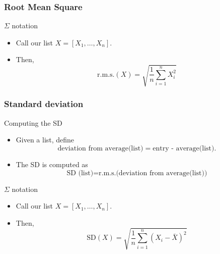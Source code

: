 \documentclass[handout]{beamer}
\begin{document}

   \begin{frame} \frametitle{Root Mean Square}

   \begin{block}
   {$\Sigma$ notation}

   \begin{itemize}
   \item Call our list $X=[X_1, \dots, X_n]$.

   \item Then,
   $$
   \text{r.m.s.}(X) = \sqrt{\frac{1}{n}\sum_{i=1}^n X_i^2}$$
   \end{itemize}



   \end{block}
   \end{frame}


   \begin{frame} \frametitle{Standard deviation}

   \begin{block}
   {Computing the SD}

   \begin{itemize}
   \item    Given a list, define
   $$
   \text{deviation from average(list)} = \text{entry - average(list)}.
   $$

   \item    The SD is computed as
   $$
   \text{SD (list)} = \text{r.m.s.(deviation from average(list))}
   $$

   \end{itemize}



   \end{block}

   \begin{block}
   {$\Sigma$ notation}

   \begin{itemize}
   \item Call our list $X=[X_1, \dots, X_n]$.

   \item Then,
   $$
   \text{SD}(X) = \sqrt{\frac{1}{n}\sum_{i=1}^n (X_i-\bar{X})^2}$$
   \end{itemize}



   \end{block}
   \end{frame}
\end{document}
